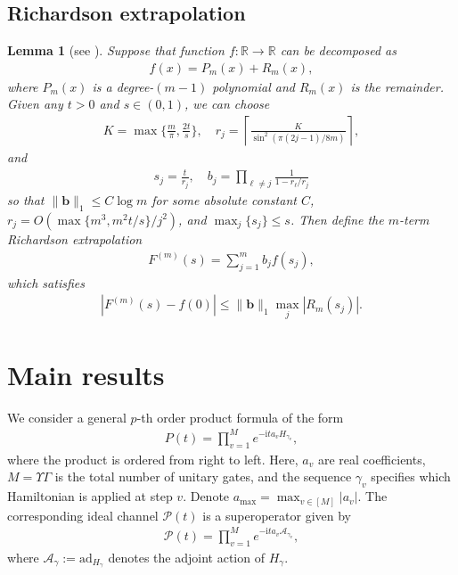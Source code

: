 \documentclass[11pt]{article}
\newtheorem{lemma}{Lemma}
\renewcommand{\i}{\mathrm{i}}
\newcommand{\ad}{\mathrm{ad}}
\renewcommand{\P}{\mathcal{P}}
\newcommand{\A}{\mathcal{A}}
\newcommand{\mb}{\mathbb}
\begin{document}
\subsection{Richardson extrapolation}

\begin{lemma}[{see \cite[Lemma A.9]{wang2025randomized}}]
\label{lem:richardson-extrapolation}
    Suppose that function $f\colon \mb R \to \mathbb{R}$ can be decomposed as 
    \begin{align*}
        f(x) = P_m(x)+R_m(x),
    \end{align*} 
    where $P_m(x)$ is a degree-$(m-1)$ polynomial and $R_m(x)$ is the remainder. Given any $t > 0$ and $s\in (0,1)$, we can choose 
    \begin{align*}
        K = \max\Big\{\frac{m}{\pi}, \frac{2t}{s}\Big\}, \quad r_j =\left\lceil \frac{K}{\sin^2(\pi(2j-1)/8m)}\right\rceil,
    \end{align*}
    and
    \begin{align*}
        s_j = \frac{t}{r_j}, \quad b_j=\prod_{\ell \neq j} \frac{1}{1-r_\ell/r_j}
    \end{align*}
    so that $\|\mathbf{b}\|_1 \le C\log m$ for some absolute constant $C$, $r_j=O(\max\{m^3, m^2t/s\}/j^2)$, and $\max_{j}\{ s_j \}\le s$. Then define the $m$-term Richardson extrapolation \begin{align}
        \label{eq_richardson extrapolation}
        F^{(m)}(s)=\sum_{j=1}^m b_j f(s_j),
    \end{align}
    which satisfies \begin{align}
    \label{eq:error-F}
        |F^{(m)}(s)-f(0)|\le \|\mathbf{b}\|_1 \max_j|R_{m}(s_j)|.
    \end{align}
\end{lemma}

\section{Main results}
We consider a general $p$-th order product formula of the form
\begin{align*}
    P(t) = \prod_{v=1}^Me^{-\i t a_{v} H_{\gamma_v}},
\end{align*}
where the product is ordered from right to left. Here, $a_{v}$ are real coefficients, $M = \Upsilon\Gamma$ is the total number of unitary gates, and the sequence $\gamma_v$ specifies which Hamiltonian is applied at step $v$. Denote $a_{\max} = \max_{v\in [M]} |a_v|$. The corresponding ideal channel $\P(t)$ is a superoperator given by
\begin{align*}
    \P(t) = \prod_{v=1}^Me^{-\i t a_{v} \A_{\gamma_v}},
\end{align*}
where $\A_{\gamma}:=\ad_{H_{\gamma}}$ denotes the adjoint action of $H_{\gamma}$. 
\end{document}
